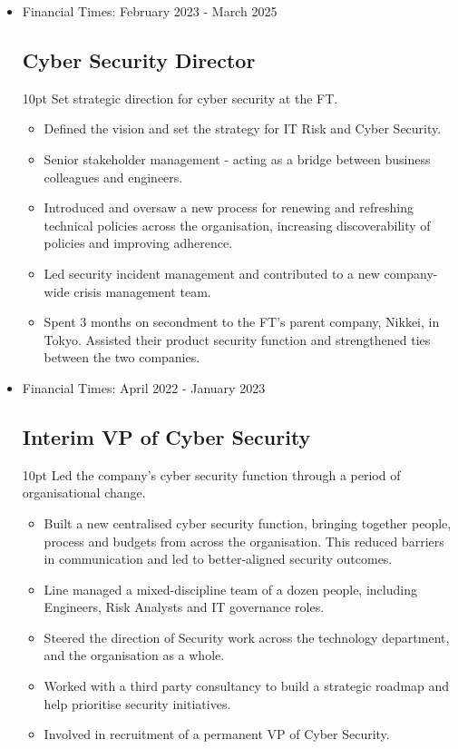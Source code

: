 \documentclass[a4paper]{article}
\newenvironment{detail}{\begin{adjustwidth}{10pt}{}}{\end{adjustwidth}}
\begin{document}
\begin{itemize}


\item Financial Times: February 2023 - March 2025
\subsection*{Cyber Security Director}
\begin{detail}
Set strategic direction for cyber security at the FT.

\begin{itemize}
	\item Defined the vision and set the strategy for IT Risk and Cyber Security.
	\item Senior stakeholder management - acting as a bridge between business colleagues and engineers.
	\item Introduced and oversaw a new process for renewing and refreshing technical policies across the organisation, increasing discoverability of policies and improving adherence.
	\item Led security incident management and contributed to a new company-wide crisis management team.
	\item Spent 3 months on secondment to the FT's parent company, Nikkei, in Tokyo.  Assisted their product security function and strengthened ties between the two companies.
\end{itemize}
\end{detail}

\item Financial Times: April 2022 - January 2023
\subsection*{Interim VP of Cyber Security}
\begin{detail}
Led the company's cyber security function through a period of organisational change.

\begin{itemize}
	\item Built a new centralised cyber security function, bringing together people, process and budgets from across the organisation.  This reduced barriers in communication and led to better-aligned security outcomes.
	\item Line managed a mixed-discipline team of a dozen people, including Engineers, Risk Analysts and IT governance roles.
	\item Steered the direction of Security work across the technology department, and the organisation as a whole.
	\item Worked with a third party consultancy to build a strategic roadmap and help prioritise security initiatives.
	\item Involved in recruitment of a permanent VP of Cyber Security.
\end{itemize}
\end{detail}


\end{itemize}
\end{document}
